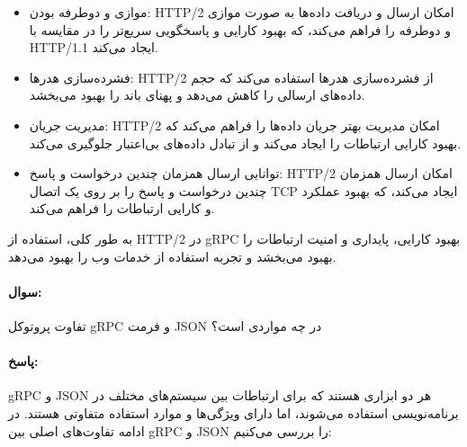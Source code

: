 \documentclass[a4paper,10pt]{article}
\begin{document}
    \begin{itemize}
        
        \item موازی و دوطرفه بودن: HTTP/2 امکان ارسال و دریافت داده‌ها به صورت موازی و دوطرفه را فراهم می‌کند، که بهبود کارایی و پاسخگویی سریع‌تر را در مقایسه با HTTP/1.1 ایجاد می‌کند.

        \item فشرده‌سازی هدرها: HTTP/2 از فشرده‌سازی هدرها استفاده می‌کند که حجم داده‌های ارسالی را کاهش می‌دهد و پهنای باند را بهبود می‌بخشد.

        \item مدیریت جریان: HTTP/2 امکان مدیریت بهتر جریان داده‌ها را فراهم می‌کند که بهبود کارایی ارتباطات را ایجاد می‌کند و از تبادل داده‌های بی‌اعتبار جلوگیری می‌کند.

        \item توانایی ارسال همزمان چندین درخواست و پاسخ: HTTP/2 امکان ارسال همزمان چندین درخواست و پاسخ را بر روی یک اتصال TCP ایجاد می‌کند، که بهبود عملکرد و کارایی ارتباطات را فراهم می‌کند.

    \end{itemize}

    به طور کلی، استفاده از HTTP/2 در gRPC بهبود کارایی، پایداری و امنیت ارتباطات را بهبود می‌بخشد و تجربه استفاده از خدمات وب را بهبود می‌دهد.

    \noindent\hrulefill

    \paragraph{سوال:} تفاوت پروتوکل gRPC و فرمت JSON در چه مواردی است؟

    \paragraph{پاسخ:} gRPC و JSON هر دو ابزاری هستند که برای ارتباطات بین سیستم‌های مختلف در برنامه‌نویسی استفاده می‌شوند، اما دارای ویژگی‌ها و موارد استفاده متفاوتی هستند. در ادامه تفاوت‌های اصلی بین gRPC و JSON را بررسی می‌کنیم:

    
\end{document}
